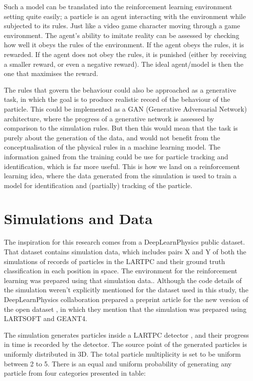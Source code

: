 Such a model can be translated into the reinforcement learning environment setting quite easily;
a particle is an agent interacting with the environment while subjected to its rules.
Just like a video game character moving through a game environment.
The agent's ability to imitate reality can be assessed by checking how well it obeys the rules of the environment.
If the agent obeys the rules, it is rewarded. If the agent does not obey the rules, it is punished (either by receiving a smaller reward, or even a negative reward).
The ideal agent/model is then the one that maximises the reward.

The rules that govern the behaviour could also be approached as a generative task, in which the goal is to produce realistic record of the behaviour of the particle.
This could be implemented as a GAN (Generative Adversarial Network) architecture, where the progress of  a generative network is assessed by comparison to the simulation rules.
But then this would mean that the task is purely about the generation of the data, and would not benefit from the conceptualisation of the physical rules in a machine learning model.
The information gained from the training could be use for particle tracking and identification, which is far more useful.
This is how we land on a reinforcement learning idea, where the data generated from the simulation is used to train a model for identification and (partially) tracking of the particle.


\section{Simulations and Data}

The inspiration for this research comes from a DeepLearnPhysics public dataset.
That dataset contains simulation data, which includes pairs X and Y of both the simulations of records of particles in the LARTPC and their ground truth classification in each position in space.
The environment for the reinforcement learning was prepared using that simulation data..
Although the code details of the simulation weren't explicitly mentioned for the dataset used in this study, the DeepLearnPhysics collaboration prepared a preprint article for the new version of the open dataset \cite{adams2020pilarnet}, in which they mention that the simulation was prepared using LARTSOFT\cite{Snider:2017wjd} and GEANT4\cite{ALLISON2016186}.

The simulation generates particles inside a LARTPC detector \cite{dlp_tutorial}, and their progress in time is recorded by the detector.
The source point of the generated particles is uniformly distributed in 3D.
The total particle multiplicity is set to be uniform between 2 to 5.
There is an equal and uniform probability of generating any particle from four categories presented in table:



